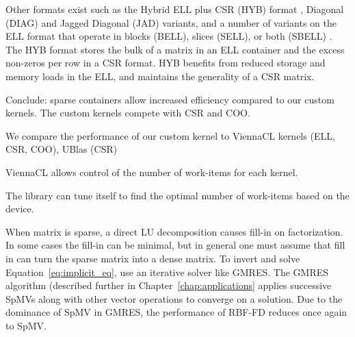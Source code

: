 \documentclass{report}
\begin{document}
Other formats exist such as the Hybrid ELL plus CSR (HYB) format \cite{Bell2009}, Diagonal (DIAG) and Jagged Diagonal (JAD) variants, and a number of variants on the ELL format that operate in blocks (BELL), slices (SELL), or both (SBELL) \cite{SuKeutzer2012}. The HYB format stores the bulk of a matrix in an ELL container and the excess non-zeros per row in a CSR format. HYB benefits from reduced storage and memory loads in the ELL, and maintains the generality of a CSR matrix. 



Conclude: sparse containers allow increased efficiency compared to our custom kernels. The custom kernels compete with CSR and COO. 




We compare the performance of our custom kernel to ViennaCL kernels (ELL, CSR, COO), UBlas (CSR) 


ViennaCL allows control of the number of work-items for each kernel. 

The library can tune itself to find the optimal number of work-items based on the device. 





When matrix is sparse, a direct LU decomposition causes fill-in on factorization. In some cases the fill-in can be minimal, but in general one must assume that fill in can turn the sparse matrix into a dense matrix. To invert and solve Equation~\ref{eq:implicit_eq}, use an iterative solver like GMRES. The GMRES algorithm (described further in Chapter~\ref{chap:applications} applies successive SpMVs along with other vector operations to converge on a solution. Due to the dominance of SpMV in GMRES, the performance of RBF-FD reduces once again to SpMV.
\end{document}
